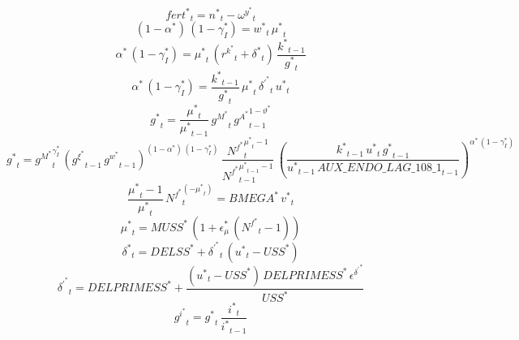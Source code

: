 \begin{dmath}
{{fert^*}}_{t}={{n^*}}_{t}-{{\omega^y^*}}_{t}
\end{dmath}
\begin{dmath}
\left(1-{{\alpha^*}}\right)\, \left(1-{{\gamma_I^*}}\right)={{w^*}}_{t}\, {{\mu^*}}_{t}
\end{dmath}
\begin{dmath}
{{\alpha^*}}\, \left(1-{{\gamma_I^*}}\right)={{\mu^*}}_{t}\, \left({{r^k^*}}_{t}+{{\delta^*}}_{t}\right)\, \frac{{{k^*}}_{t-1}}{{{g^*}}_{t}}
\end{dmath}
\begin{dmath}
{{\alpha^*}}\, \left(1-{{\gamma_I^*}}\right)=\frac{{{k^*}}_{t-1}}{{{g^*}}_{t}}\, {{\mu^*}}_{t}\, {{\delta^\prime^*}}_{t}\, {{u^*}}_{t}
\end{dmath}
\begin{dmath}
{{g^*}}_{t}=\frac{{{\mu^*}}_{t}}{{{\mu^*}}_{t-1}}\, {{g^M^*}}_{t}\, {{g^A^*}}_{t-1}^{1-{{\vartheta^*}}}
\end{dmath}
\begin{dmath}
{{g^*}}_{t}={{g^M^*}}_{t}^{{{\gamma_I^*}}}\, \left({{g^{\xi}^*}}_{t-1}\, {{g^w^*}}_{t-1}\right)^{\left(1-{{\alpha^*}}\right)\, \left(1-{{\gamma_I^*}}\right)}\, \frac{{{N^f^*}}_{t}^{{{\mu^*}}_{t}-1}}{{{N^f^*}}_{t-1}^{{{\mu^*}}_{t-1}-1}}\, \left(\frac{{{k^*}}_{t-1}\, {{u^*}}_{t}\, {{g^*}}_{t-1}}{{{u^*}}_{t-1}\, {AUX\_ENDO\_LAG\_108\_1}_{t-1}}\right)^{{{\alpha^*}}\, \left(1-{{\gamma_I^*}}\right)}
\end{dmath}
\begin{dmath}
\frac{{{\mu^*}}_{t}-1}{{{\mu^*}}_{t}}\, {{N^f^*}}_{t}^{\left(-{{\mu^*}}_{t}\right)}={{BMEGA^*}}\, {{v^*}}_{t}
\end{dmath}
\begin{dmath}
{{\mu^*}}_{t}={{MUSS^*}}\, \left(1+{{\epsilon_{\mu}^*}}\, \left({{N^f^*}}_{t}-1\right)\right)
\end{dmath}
\begin{dmath}
{{\delta^*}}_{t}={{DELSS^*}}+{{\delta^\prime^*}}_{t}\, \left({{u^*}}_{t}-{{USS^*}}\right)
\end{dmath}
\begin{dmath}
{{\delta^\prime^*}}_{t}={{DELPRIMESS^*}}+\frac{\left({{u^*}}_{t}-{{USS^*}}\right)\, {{DELPRIMESS^*}}\, {{\epsilon^{\delta^{\prime}}^*}}}{{{USS^*}}}
\end{dmath}
\begin{dmath}
{{g^i^*}}_{t}={{g^*}}_{t}\, \frac{{{i^*}}_{t}}{{{i^*}}_{t-1}}
\end{dmath}
